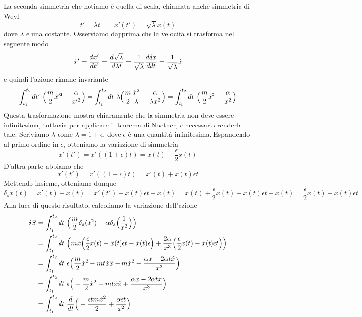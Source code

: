 \begin{example}
        \hfill

        La seconda simmetria che notiamo è quella di scala, chiamata anche simmetria di Weyl
    \begin{equation*}
        t' = \lambda t \qquad x'(t') = \sqrt{\lambda} x(t)
    \end{equation*} 
        dove $\lambda$ è una costante. Osserviamo dapprima che la velocità si trasforma nel seguente modo
    \begin{equation*}
        \dot x' = \frac{dx'}{dt'} = \frac{d\sqrt{\lambda}}{d\lambda t} = \frac{1}{\sqrt{\lambda}} \frac{ddx}{ddt} = \frac{1}{\sqrt{\lambda}} \dot x
    \end{equation*} 
        e quindi l'azione rimane invariante
    \begin{equation*}
        \int_{t_1}^{t_2}dt'~ \Big( \frac{m}{2} \dot x'^2 - \frac{\alpha}{x'^2} \Big) = \int_{t_1}^{t_2}dt~ \lambda \Big( \frac{m}{2} \frac{\dot x^2}{\lambda} - \frac{\alpha}{\lambda x^2} \Big) = \int_{t_1}^{t_2}dt~ \Big( \frac{m}{2} \dot x^2 - \frac{\alpha}{x^2} \Big)
    \end{equation*}
        Questa trasformazione mostra chiaramente che la simmetria non deve essere infinitesima, tuttavia per applicare il teorema di Noether, è necessario renderla tale. Scriviamo $\lambda$ come $\lambda = 1 + \epsilon$, dove $\epsilon$ è una quantità infinitesima. Espandendo al primo ordine in $\epsilon$, otteniamo la variazione di simmetria
    \begin{equation*}
        x'(t') = x'((1+\epsilon)t) = x(t) + \frac{\epsilon}{2} x(t)
    \end{equation*}
        D'altra parte abbiamo che 
    \begin{equation*}
        x'(t') = x'((1+\epsilon)t) = x'(t) + \dot x(t) \epsilon t
    \end{equation*}
        Mettendo insieme, otteniamo dunque
    \begin{equation*}
        \delta_s x(t) = x'(t) - x(t) = x'(t') - \dot x(t) \epsilon t - x(t) = x(t) + \frac{\epsilon}{2} x(t) - \dot x(t) \epsilon t - x(t) = \frac{\epsilon}{2} x(t) - \dot x(t) \epsilon t 
    \end{equation*}
        Alla luce di questo risultato, calcoliamo la variazione dell'azione
    \begin{equation}
    \begin{aligned}
        \delta S & = \integ{t_1}{t_2}{t} \Big( \frac{m}{2} \delta_s (\dot x^2) - \alpha \delta_s \Big (\frac{1}{x^2} \Big) \Big) \\ & = \integ{t_1}{t_2}{t} \Big( m \dot x \Big( \frac{\epsilon}{2} \dot x(t) - \ddot x(t) \epsilon t - \dot x(t) \epsilon \Big) + \frac{2 \alpha}{x^3} \Big( \frac{\epsilon}{2} x(t) - \dot x(t) \epsilon t \Big) \Big) \\ & = \integ{t_1}{t_2}{t} \epsilon \Big( \frac{m}{2} \dot x^2 - m t \dot x \ddot x - m \dot x^2 + \frac{\alpha x - 2 \alpha t \dot x}{x^3}\Big) \\ & = \integ{t_1}{t_2}{t} \epsilon \Big( - \frac{m}{2} \dot x^2 - m t \dot x \ddot x + \frac{\alpha x - 2 \alpha t \dot x}{x^3}\Big) \\ & = \integ{t_1}{t_2}{t} \dv{}{t} \Big ( - \frac{\epsilon t m \dot x^2}{2} + \frac{\alpha \epsilon t}{x^2} \Big)

\end{aligned}
\end{equation}
\end{example}
